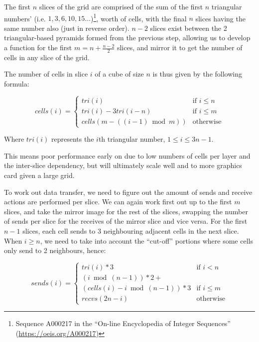 \documentclass[conference]{IEEEtran}
\begin{document}
The first $ n $ slices of the grid are comprised of the sum of the first $ n $ triangular numbers’ (i.e. $ 1, 3, 6, 10, 15\dots $)\footnote{Sequence A000217 in the ``On-line Encyclopedia of Integer Sequences'' (\url{https://oeis.org/A000217})}, worth of cells, with the final $ n $ slices having the same number also (just in reverse order). $ n - 2 $ slices exist between the 2 triangular-based pyramids formed from the previous step, allowing us to develop a function for the first $ m = n + \frac{n - 2}{2} $ slices, and mirror it to get the number of cells in any slice of the grid.

The number of cells in slice $ i $ of a cube of size $ n $ is thus given by the following formula:

\begin{equation}
cells(i) = \left\{
	\begin{array}{ll}
		tri(i) & \mbox{if } i \le n \\
		tri(i) - 3tri(i - n) & \mbox{if } i \le m \\
		cells(m - ((i - 1)\bmod m)) & \mbox{otherwise}
	\end{array}
\right.
\end{equation}

Where $ tri(i) $ represents the $i$th triangular number, $ 1 \le i \le 3n - 1 $. 

This means poor performance early on due to low numbers of cells per layer and the inter-slice dependency, but will ultimately scale well and to more graphics card given a large grid.

To work out data transfer, we need to figure out the amount of sends and receive actions are performed per slice. We can again work first out up to the first $ m $ slices, and take the mirror image for the rest of the slices, swapping the number of sends per slice for the receives of the mirror slice and vice versa. For the first $ n - 1 $ slices, each cell sends to 3 neighbouring adjacent cells in the next slice. When $ i \ge n $, we need to take into account the ``cut-off'' portions where some cells only send to 2 neighbours, hence:

\begin{equation}
sends(i) = \left\{
	\begin{array}{ll}
		tri(i) * 3 & \mbox{if } i < n \\
		(i\bmod(n - 1)) * 2 + \\
			(cells(i) - i\bmod(n - 1)) * 3 & \mbox{if } i \le m \\
		recvs(2n - i) & \mbox{otherwise}
	\end{array}
\right.
\end{equation}
\end{document}
